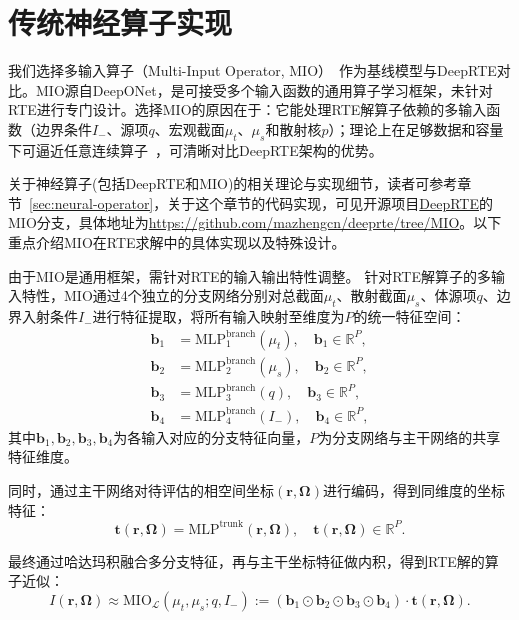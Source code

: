 \section{传统神经算子实现}

我们选择多输入算子（Multi-Input Operator, MIO）~\cite{jin2022mionet}作为基线模型与DeepRTE对比。MIO源自DeepONet，是可接受多个输入函数的通用算子学习框架，未针对RTE进行专门设计。选择MIO的原因在于：它能处理RTE解算子依赖的多输入函数（边界条件$I_-$、源项$q$、宏观截面$\mu_t$、$\mu_s$和散射核$p$）；理论上在足够数据和容量下可逼近任意连续算子~\cite{lu2021learning}，可清晰对比DeepRTE架构的优势。

关于神经算子(包括DeepRTE和MIO)的相关理论与实现细节，读者可参考章节~\ref{sec:neural-operator}，关于这个章节的代码实现，可见开源项目\href{https://github.com/mazhengcn/deeprte/tree/main}{DeepRTE}的MIO分支，具体地址为\url{https://github.com/mazhengcn/deeprte/tree/MIO}。以下重点介绍MIO在RTE求解中的具体实现以及特殊设计。

由于MIO是通用框架，需针对RTE的输入输出特性调整。
针对RTE解算子的多输入特性，MIO通过4个独立的分支网络分别对总截面$\mu_t$、散射截面$\mu_s$、体源项$q$、边界入射条件$I_-$进行特征提取，将所有输入映射至维度为$P$的统一特征空间：
\begin{align}
    \boldsymbol{b}_1 & = \text{MLP}^{\text{branch}}_1(\mu_t), \quad \boldsymbol{b}_1 \in \mathbb{R}^P, \\
    \boldsymbol{b}_2 & = \text{MLP}^{\text{branch}}_2(\mu_s), \quad \boldsymbol{b}_2 \in \mathbb{R}^P, \\
    \boldsymbol{b}_3 & = \text{MLP}^{\text{branch}}_3(q), \quad \boldsymbol{b}_3 \in \mathbb{R}^P,     \\
    \boldsymbol{b}_4 & = \text{MLP}^{\text{branch}}_4(I_-), \quad \boldsymbol{b}_4 \in \mathbb{R}^P,
\end{align}
其中$\boldsymbol{b}_1,\boldsymbol{b}_2,\boldsymbol{b}_3,\boldsymbol{b}_4$为各输入对应的分支特征向量，$P$为分支网络与主干网络的共享特征维度。

同时，通过主干网络对待评估的相空间坐标$(\boldsymbol{r},\boldsymbol{\Omega})$进行编码，得到同维度的坐标特征：
\begin{equation}
    \boldsymbol{t}(\boldsymbol{r},\boldsymbol{\Omega}) = \text{MLP}^{\text{trunk}}(\boldsymbol{r},\boldsymbol{\Omega}), \quad \boldsymbol{t}(\boldsymbol{r},\boldsymbol{\Omega}) \in \mathbb{R}^P.
\end{equation}

最终通过哈达玛积融合多分支特征，再与主干坐标特征做内积，得到RTE解的算子近似：
\begin{equation}
    I(\boldsymbol{r},\boldsymbol{\Omega}) \approx \text{MIO}_{\mathcal{L}}(\mu_t,\mu_s;q,I_-) := \left( \boldsymbol{b}_1 \odot \boldsymbol{b}_2 \odot \boldsymbol{b}_3 \odot \boldsymbol{b}_4 \right) \cdot \boldsymbol{t}(\boldsymbol{r},\boldsymbol{\Omega}).
\end{equation}

